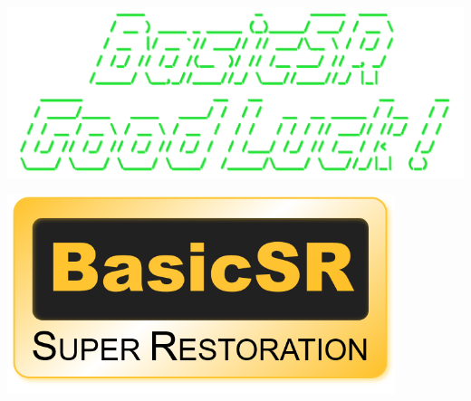 \documentclass[a4paper, 12pt, oneside]{memoir}
\begin{document}



\begin{CJK}{UTF8}{gbsn}
    
    

    \newpage
    \tableofcontents*\label{toc}
\end{CJK}

\begin{CJK}{UTF8}{gbsn}
    {
        \pagestyle{fancy}
        \fancyhf{}
        \rhead{\rightmark}
        \chead{\thepage}
        \renewcommand{\chaptermark}[1]{\markboth{#1}{}}

        
        
        
        
        
        
        
        
        
        
        
    }
\end{CJK}

\clearpage
\newpage
\thispagestyle{empty}
\begin{center}
    \vspace*{5cm}
    \includegraphics[width=16cm]{figures/good_luck.png}
\end{center}
\begin{center}
    \vspace*{1cm}
    \includegraphics[width=0.85\textwidth]{figures/basicsr_logo.png}
\end{center}


% 
\end{document}

